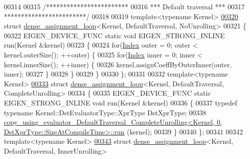 \begin{DoxyCode}
00314 
00315 \textcolor{comment}{/************************}
00316 \textcolor{comment}{*** Default traversal ***}
00317 \textcolor{comment}{************************/}
00318 
00319 \textcolor{keyword}{template}<\textcolor{keyword}{typename} Kernel>
\hyperlink{struct_eigen_1_1internal_1_1dense__assignment__loop_3_01_kernel_00_01_default_traversal_00_01_no_unrolling_01_4}{00320} \textcolor{keyword}{struct }\hyperlink{struct_eigen_1_1internal_1_1dense__assignment__loop}{dense\_assignment\_loop}<Kernel, DefaultTraversal, NoUnrolling>
00321 \{
00322   EIGEN\_DEVICE\_FUNC \textcolor{keyword}{static} \textcolor{keywordtype}{void} EIGEN\_STRONG\_INLINE run(Kernel &kernel)
00323   \{
00324     \textcolor{keywordflow}{for}(\hyperlink{namespace_eigen_a62e77e0933482dafde8fe197d9a2cfde}{Index} outer = 0; outer < kernel.outerSize(); ++outer) \{
00325       \textcolor{keywordflow}{for}(\hyperlink{namespace_eigen_a62e77e0933482dafde8fe197d9a2cfde}{Index} inner = 0; inner < kernel.innerSize(); ++inner) \{
00326         kernel.assignCoeffByOuterInner(outer, inner);
00327       \}
00328     \}
00329   \}
00330 \};
00331 
00332 \textcolor{keyword}{template}<\textcolor{keyword}{typename} Kernel>
\hyperlink{struct_eigen_1_1internal_1_1dense__assignment__loop_3_01_kernel_00_01_default_traversal_00_01_complete_unrolling_01_4}{00333} \textcolor{keyword}{struct }\hyperlink{struct_eigen_1_1internal_1_1dense__assignment__loop}{dense\_assignment\_loop}<Kernel, DefaultTraversal, CompleteUnrolling>
00334 \{
00335   EIGEN\_DEVICE\_FUNC \textcolor{keyword}{static} EIGEN\_STRONG\_INLINE \textcolor{keywordtype}{void} run(Kernel &kernel)
00336   \{
00337     \textcolor{keyword}{typedef} \textcolor{keyword}{typename} Kernel::DstEvaluatorType::XprType DstXprType;
00338     
      \hyperlink{struct_eigen_1_1internal_1_1copy__using__evaluator___default_traversal___complete_unrolling}{copy\_using\_evaluator\_DefaultTraversal\_CompleteUnrolling<Kernel, 0, DstXprType::SizeAtCompileTime>::run}
      (kernel);
00339   \}
00340 \};
00341 
00342 \textcolor{keyword}{template}<\textcolor{keyword}{typename} Kernel>
\hyperlink{struct_eigen_1_1internal_1_1dense__assignment__loop_3_01_kernel_00_01_default_traversal_00_01_inner_unrolling_01_4}{00343} \textcolor{keyword}{struct }\hyperlink{struct_eigen_1_1internal_1_1dense__assignment__loop}{dense\_assignment\_loop}<Kernel, DefaultTraversal, InnerUnrolling>

\end{DoxyCode}
